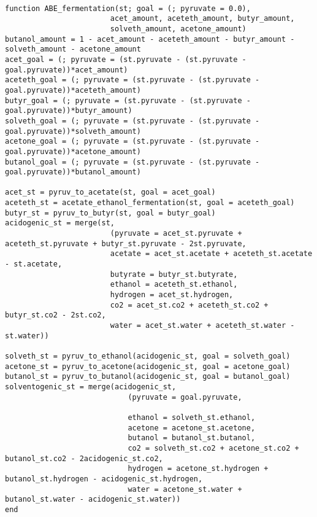 \documentclass[11pt]{article}
\begin{document}
\begin{verbatim}

function ABE_fermentation(st; goal = (; pyruvate = 0.0),
                        acet_amount, aceteth_amount, butyr_amount,
                        solveth_amount, acetone_amount)
butanol_amount = 1 - acet_amount - aceteth_amount - butyr_amount - solveth_amount - acetone_amount
acet_goal = (; pyruvate = (st.pyruvate - (st.pyruvate - goal.pyruvate))*acet_amount)
aceteth_goal = (; pyruvate = (st.pyruvate - (st.pyruvate - goal.pyruvate))*aceteth_amount)
butyr_goal = (; pyruvate = (st.pyruvate - (st.pyruvate - goal.pyruvate))*butyr_amount)
solveth_goal = (; pyruvate = (st.pyruvate - (st.pyruvate - goal.pyruvate))*solveth_amount)
acetone_goal = (; pyruvate = (st.pyruvate - (st.pyruvate - goal.pyruvate))*acetone_amount)
butanol_goal = (; pyruvate = (st.pyruvate - (st.pyruvate - goal.pyruvate))*butanol_amount)

acet_st = pyruv_to_acetate(st, goal = acet_goal)
aceteth_st = acetate_ethanol_fermentation(st, goal = aceteth_goal)
butyr_st = pyruv_to_butyr(st, goal = butyr_goal)
acidogenic_st = merge(st,
                        (pyruvate = acet_st.pyruvate + aceteth_st.pyruvate + butyr_st.pyruvate - 2st.pyruvate,
                        acetate = acet_st.acetate + aceteth_st.acetate - st.acetate,
                        butyrate = butyr_st.butyrate,
                        ethanol = aceteth_st.ethanol,
                        hydrogen = acet_st.hydrogen,
                        co2 = acet_st.co2 + aceteth_st.co2 + butyr_st.co2 - 2st.co2,
                        water = acet_st.water + aceteth_st.water - st.water))

solveth_st = pyruv_to_ethanol(acidogenic_st, goal = solveth_goal)
acetone_st = pyruv_to_acetone(acidogenic_st, goal = acetone_goal)
butanol_st = pyruv_to_butanol(acidogenic_st, goal = butanol_goal)
solventogenic_st = merge(acidogenic_st,
                            (pyruvate = goal.pyruvate,

                            ethanol = solveth_st.ethanol,
                            acetone = acetone_st.acetone,
                            butanol = butanol_st.butanol,
                            co2 = solveth_st.co2 + acetone_st.co2 + butanol_st.co2 - 2acidogenic_st.co2,
                            hydrogen = acetone_st.hydrogen + butanol_st.hydrogen - acidogenic_st.hydrogen,
                            water = acetone_st.water + butanol_st.water - acidogenic_st.water))
end

\end{verbatim}
\end{document}
